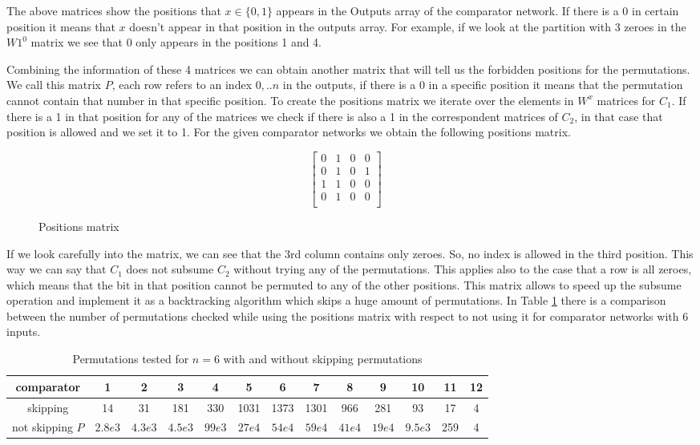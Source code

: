 \documentclass[../main.tex]{subfiles}
\begin{document}
	The above matrices show the positions that $x \in \{0, 1\}$ appears in the Outputs array of the comparator network. If there is a 0 in certain position it means that $x$ doesn't appear in that position in the outputs array. For example, if we look at the partition with 3 zeroes in the $W1^0$ matrix we see that 0 only appears in the positions 1 and 4.
	
	Combining the information of these 4 matrices we can obtain another matrix that will tell us the forbidden positions for the permutations. We call this matrix $P$, each row refers to an index $0,..n$ in the outputs, if there is a 0 in a specific position it means that the permutation cannot contain that number in that specific position. To create the positions matrix we iterate over the elements in $W^x$ matrices for $C_1$. If there is a 1 in that position for any of the matrices we check if there is also a 1 in the correspondent matrices of $C_2$, in that case that position is allowed and we set it to 1. For the given comparator networks we obtain the following positions matrix.
	
	\begin{figure}[H]
		$$
		\begin{bmatrix} 
			0 & 1 & 0 & 0 \\
			0 & 1 & 0 & 1 \\
			1 & 1 & 0 & 0 \\
			0 & 1 & 0 & 0 \\
		\end{bmatrix}
		\quad
		$$
		\caption{Positions matrix}
		\label{positionsMatrix}
	\end{figure}

	
	If we look carefully into the matrix, we can see that the 3rd column contains only zeroes. So, no index is allowed in the third position. This way we can say that $C_1$ does not subsume $C_2$ without trying any of the permutations. This applies also to the case that a row is all zeroes, which means that the bit in that position cannot be permuted to any of the other positions. This matrix allows to speed up the subsume operation and implement it as a backtracking algorithm which skips a huge amount of permutations. In Table \ref{table:compareSubsume} there is a comparison between the number of permutations checked while using the positions matrix with respect to not using it for comparator networks with 6 inputs.
	
	\begin{table}[H]
		\hspace*{-1.5cm}
		\begin{tabular}{|c |c c c c c c c c c c c c|}
			\hline
 			comparator & 1 & 2 & 3 & 4 & 5 & 6 & 7 & 8 & 9 & 10 & 11 & 12 \\
			\hline
			skipping & 14 & 31 & 181 & 330 & 1031 & 1373 & 1301 & 966 & 281 & 93 & 17 & 4 \\ [1ex]
			\hline
			not skipping $P$ & $2.8e3$ & $4.3e3$ & $4.5e3$ & $99e3$ & $27e4$ & $54e4$ & $59e4$ & $41e4$ & $19e4$ & $9.5e3$ & 259 & 4 \\  [1ex] 
			\hline
		\end{tabular}
		\caption{Permutations tested for $n=6$ with and without skipping permutations}
		\label{table:compareSubsume}
	\end{table}
	
\end{document}
